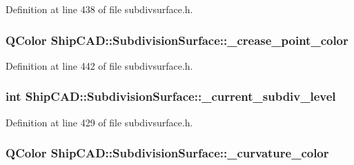 Definition at line 438 of file subdivsurface.\+h.

\subsubsection[{\texorpdfstring{\+\_\+crease\+\_\+point\+\_\+color}{_crease_point_color}}]{\setlength{\rightskip}{0pt plus 5cm}Q\+Color Ship\+C\+A\+D\+::\+Subdivision\+Surface\+::\+\_\+crease\+\_\+point\+\_\+color\hspace{0.3cm}{\ttfamily [protected]}}\hypertarget{classShipCAD_1_1SubdivisionSurface_a9602182d9a123dc267d34a2cd1b45ed7}{}\label{classShipCAD_1_1SubdivisionSurface_a9602182d9a123dc267d34a2cd1b45ed7}


Definition at line 442 of file subdivsurface.\+h.

\subsubsection[{\texorpdfstring{\+\_\+current\+\_\+subdiv\+\_\+level}{_current_subdiv_level}}]{\setlength{\rightskip}{0pt plus 5cm}int Ship\+C\+A\+D\+::\+Subdivision\+Surface\+::\+\_\+current\+\_\+subdiv\+\_\+level\hspace{0.3cm}{\ttfamily [protected]}}\hypertarget{classShipCAD_1_1SubdivisionSurface_a9e5424746eced5d0a06ccbe4055bd06f}{}\label{classShipCAD_1_1SubdivisionSurface_a9e5424746eced5d0a06ccbe4055bd06f}


Definition at line 429 of file subdivsurface.\+h.

\subsubsection[{\texorpdfstring{\+\_\+curvature\+\_\+color}{_curvature_color}}]{\setlength{\rightskip}{0pt plus 5cm}Q\+Color Ship\+C\+A\+D\+::\+Subdivision\+Surface\+::\+\_\+curvature\+\_\+color\hspace{0.3cm}{\ttfamily [protected]}}\hypertarget{classShipCAD_1_1SubdivisionSurface_a05a83d21996abb065abe7f3109f35a73}{}\label{classShipCAD_1_1SubdivisionSurface_a05a83d21996abb065abe7f3109f35a73}


